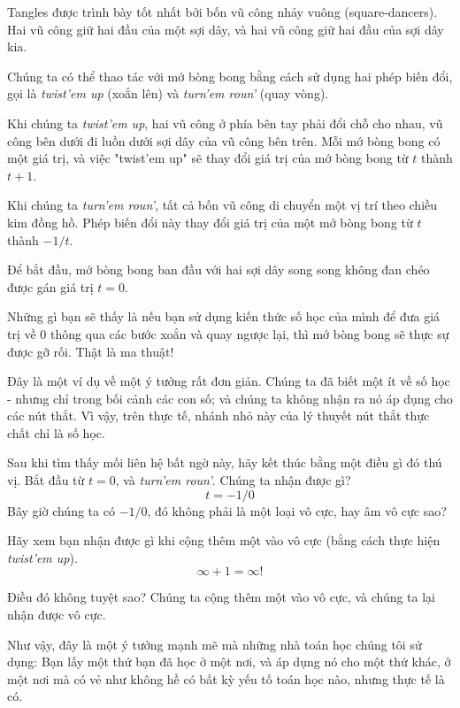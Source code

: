 \documentclass[12pt,a4paper]{article}
\begin{document}
Tangles được trình bày tốt nhất bởi bốn vũ công nhảy vuông (square-dancers). Hai vũ công giữ hai đầu của một sợi dây, và hai vũ công giữ hai đầu của sợi dây kia.

Chúng ta có thể thao tác với mớ bòng bong bằng cách sử dụng hai phép biến đổi, gọi là \textit{twist'em up} (xoắn lên) và \textit{turn'em roun'} (quay vòng).

Khi chúng ta \textit{twist'em up}, hai vũ công ở phía bên tay phải đổi chỗ cho nhau, vũ công bên dưới đi luồn dưới sợi dây của vũ công bên trên. Mỗi mớ bòng bong có một giá trị, và việc "twist'em up" sẽ thay đổi giá trị của mớ bòng bong từ $t$ thành $t+1$.

Khi chúng ta \textit{turn'em roun'}, tất cả bốn vũ công di chuyển một vị trí theo chiều kim đồng hồ. Phép biến đổi này thay đổi giá trị của một mớ bòng bong từ $t$ thành $-1/t$.

Để bắt đầu, mớ bòng bong ban đầu với hai sợi dây song song không đan chéo được gán giá trị $t = 0$.

Những gì bạn sẽ thấy là nếu bạn sử dụng kiến thức số học của mình để đưa giá trị về 0 thông qua các bước xoắn và quay ngược lại, thì mớ bòng bong sẽ thực sự được gỡ rối. Thật là ma thuật!

Đây là một ví dụ về một ý tưởng rất đơn giản. Chúng ta đã biết một ít về số học - nhưng chỉ trong bối cảnh các con số; và chúng ta không nhận ra nó áp dụng cho các nút thắt. Vì vậy, trên thực tế, nhánh nhỏ này của lý thuyết nút thắt thực chất chỉ là số học.

Sau khi tìm thấy mối liên hệ bất ngờ này, hãy kết thúc bằng một điều gì đó thú vị. Bắt đầu từ $t = 0$, và \textit{turn'em roun'}. Chúng ta nhận được gì?
$$t = -1/0$$
Bây giờ chúng ta có $-1/0$, đó không phải là một loại vô cực, hay âm vô cực sao?

Hãy xem bạn nhận được gì khi cộng thêm một vào vô cực (bằng cách thực hiện \textit{twist'em up}).
$$\infty + 1 = \infty!$$

Điều đó không tuyệt sao? Chúng ta cộng thêm một vào vô cực, và chúng ta lại nhận được vô cực.

Như vậy, đây là một ý tưởng mạnh mẽ mà những nhà toán học chúng tôi sử dụng: Bạn lấy một thứ bạn đã học ở một nơi, và áp dụng nó cho một thứ khác, ở một nơi mà có vẻ như không hề có bất kỳ yếu tố toán học nào, nhưng thực tế là có.
\end{document}
